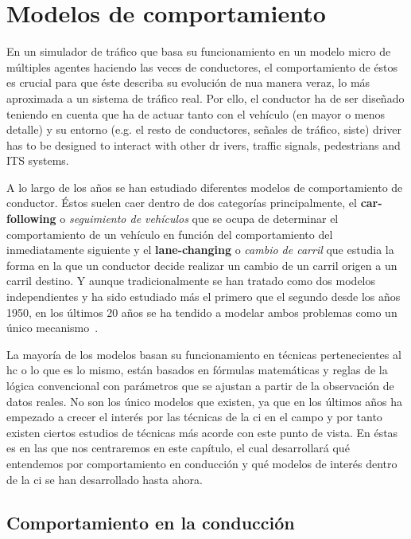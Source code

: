 \chapter{Modelos de comportamiento}
\label{ch:sota-behavior-models}

En un simulador de tráfico que basa su funcionamiento en un modelo micro de múltiples agentes haciendo las veces de conductores, el comportamiento de éstos es crucial para que éste describa su evolución de nua manera veraz, lo más aproximada a un sistema de tráfico real. Por ello, el conductor ha de ser diseñado teniendo en cuenta que ha de actuar tanto con el vehículo (en mayor o menos detalle) y su entorno (e.g. el resto de conductores, señales de tráfico, siste)
driver  has  to  be  designed  to  interact  with  other  dr
ivers,  traffic  signals,  pedestrians  and  ITS 
systems.

A lo largo de los años se han estudiado diferentes modelos de comportamiento de conductor. Éstos suelen caer dentro de dos categorías principalmente, el \textbf{car-following} o \textit{seguimiento de vehículos} que se ocupa de determinar el comportamiento de un vehículo en función del comportamiento del inmediatamente siguiente y el \textbf{lane-changing} o \textit{cambio de carril} que estudia la forma en la que un conductor decide realizar un cambio de un carril origen a un carril destino. Y aunque tradicionalmente se han tratado como dos modelos independientes y ha sido estudiado más el primero que el segundo desde los años 1950, en los últimos 20 años se ha tendido a modelar ambos problemas como un único mecanismo~\cite{Ma}.

La mayoría de los modelos basan su funcionamiento en técnicas pertenecientes al \acrlong{hc} o lo que es lo mismo, están basados en fórmulas matemáticas y reglas de la lógica convencional con parámetros que se ajustan a partir de la observación de datos reales. No son los único modelos que existen, ya que en los últimos años ha empezado a crecer el interés por las técnicas de la \ac{ci} en el campo y por tanto existen ciertos estudios de técnicas más acorde con este punto de vista. En éstas es en las que nos centraremos en este capítulo, el cual desarrollará qué entendemos por comportamiento en conducción y qué modelos de interés dentro de la \ac{ci} se han desarrollado hasta ahora.

\section{Comportamiento en la conducción}

